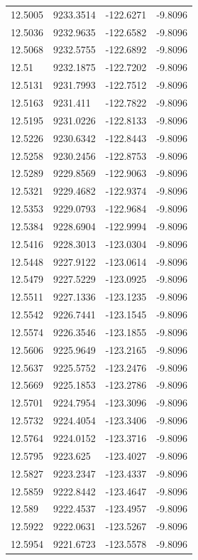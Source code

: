 \begin{table}[H]
\begin{tabular}{llll}
12.5005 & 9233.3514 & -122.6271 & -9.8096 \\
12.5036 & 9232.9635 & -122.6582 & -9.8096 \\
12.5068 & 9232.5755 & -122.6892 & -9.8096 \\
12.51 & 9232.1875 & -122.7202 & -9.8096 \\
12.5131 & 9231.7993 & -122.7512 & -9.8096 \\
12.5163 & 9231.411 & -122.7822 & -9.8096 \\
12.5195 & 9231.0226 & -122.8133 & -9.8096 \\
12.5226 & 9230.6342 & -122.8443 & -9.8096 \\
12.5258 & 9230.2456 & -122.8753 & -9.8096 \\
12.5289 & 9229.8569 & -122.9063 & -9.8096 \\
12.5321 & 9229.4682 & -122.9374 & -9.8096 \\
12.5353 & 9229.0793 & -122.9684 & -9.8096 \\
12.5384 & 9228.6904 & -122.9994 & -9.8096 \\
12.5416 & 9228.3013 & -123.0304 & -9.8096 \\
12.5448 & 9227.9122 & -123.0614 & -9.8096 \\
12.5479 & 9227.5229 & -123.0925 & -9.8096 \\
12.5511 & 9227.1336 & -123.1235 & -9.8096 \\
12.5542 & 9226.7441 & -123.1545 & -9.8096 \\
12.5574 & 9226.3546 & -123.1855 & -9.8096 \\
12.5606 & 9225.9649 & -123.2165 & -9.8096 \\
12.5637 & 9225.5752 & -123.2476 & -9.8096 \\
12.5669 & 9225.1853 & -123.2786 & -9.8096 \\
12.5701 & 9224.7954 & -123.3096 & -9.8096 \\
12.5732 & 9224.4054 & -123.3406 & -9.8096 \\
12.5764 & 9224.0152 & -123.3716 & -9.8096 \\
12.5795 & 9223.625 & -123.4027 & -9.8096 \\
12.5827 & 9223.2347 & -123.4337 & -9.8096 \\
12.5859 & 9222.8442 & -123.4647 & -9.8096 \\
12.589 & 9222.4537 & -123.4957 & -9.8096 \\
12.5922 & 9222.0631 & -123.5267 & -9.8096 \\
12.5954 & 9221.6723 & -123.5578 & -9.8096 \\

\end{tabular}
\end{table}
